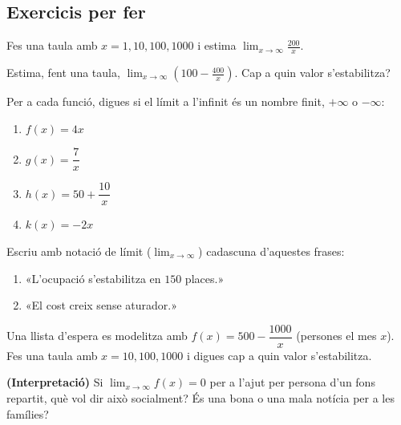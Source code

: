 \subsection{Exercicis per fer}

\begin{exercicis}
\begin{exlist}
  \item Fes una taula amb $x=1,10,100,1000$ i estima
        $\displaystyle\lim_{x\to\infty}\frac{200}{x}$.
  \item Estima, fent una taula, $\displaystyle\lim_{x\to\infty}\left(100-\frac{400}{x}\right)$.
        Cap a quin valor s'estabilitza?
  \item Per a cada funció, digues si el límit a l'infinit és un nombre finit,
        $+\infty$ o $-\infty$:
        \begin{enumerate}[label=\alph*), leftmargin=1.6em, topsep=2pt]
          \item $f(x)=4x$ \hfill \item $g(x)=\dfrac{7}{x}$ \hfill
          \item $h(x)=50+\dfrac{10}{x}$ \hfill \item $k(x)=-2x$
        \end{enumerate}
  \item Escriu amb notació de límit ($\lim_{x\to\infty}$) cadascuna d'aquestes frases:
        \begin{enumerate}[label=\alph*), leftmargin=1.6em, topsep=2pt]
          \item «L'ocupació s'estabilitza en $150$ places.»
          \item «El cost creix sense aturador.»
        \end{enumerate}
  \item Una llista d'espera es modelitza amb $f(x)=500-\dfrac{1000}{x}$ (persones el mes
        $x$). Fes una taula amb $x=10,100,1000$ i digues cap a quin valor s'estabilitza.
  \item \textbf{(Interpretació)} Si $\displaystyle\lim_{x\to\infty}f(x)=0$ per a l'ajut
        per persona d'un fons repartit, què vol dir això socialment? És una bona o una
        mala notícia per a les famílies?
\end{exlist}
\end{exercicis}

